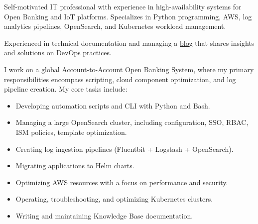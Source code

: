 \documentclass[10pt,a4paper]{altacv}
\begin{document}



\begin{fullwidth}
    \makecvheader
\end{fullwidth}



Self-motivated IT professional with experience in high-availability systems for Open Banking and IoT platforms. Specializes in Python programming, AWS, log analytics pipelines, OpenSearch, and Kubernetes workload management.

\bigskip

Experienced in technical documentation and managing a \href{https://www.carlosneto.dev/}{\uline{blog}} that shares insights and solutions on DevOps practices.



I work on a global Account-to-Account Open Banking System, where my primary responsibilities encompass scripting, cloud component optimization, and log pipeline creation. My core tasks include:

\bigskip

\begin{itemize}
    \item Developing automation scripts and CLI with Python and Bash.
    \item Managing a large OpenSearch cluster, including configuration, SSO, RBAC, ISM policies, template optimization.
    \item Creating log ingestion pipelines (Fluentbit + Logstash + OpenSearch).
    \item Migrating applications to Helm charts.
    \item Optimizing AWS resources with a focus on performance and security.
    \item Operating, troubleshooting, and optimizing Kubernetes clusters.
    \item Writing and maintaining Knowledge Base documentation.
\end{itemize}
\end{document}
